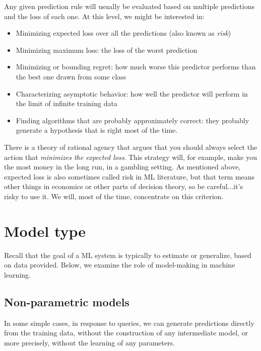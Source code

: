 Any given prediction rule will usually be evaluated based on multiple predictions and the loss of each one.  At this level, we might be interested in:
\begin{itemize}
  \item Minimizing expected loss over all the predictions (also known as {\em risk})
  \item Minimizing maximum loss: the loss of the worst prediction
  \item Minimizing or bounding regret: how much worse this predictor performs than the best one drawn from some class
  \item Characterizing asymptotic behavior: how well the predictor will perform in the limit of infinite training data
  \item Finding algorithms that are probably approximately correct:  they probably generate a hypothesis that is right most of the time.
\end{itemize}

There is a theory of rational agency that argues that you should
always select the action that {\em minimizes the expected loss}.  This
strategy will, for example, make you the most money in the long run,
in a gambling setting.    As mentioned above, expected loss is
also sometimes called risk in ML literature,
but that term means other things in economics or other parts of
decision theory, so be careful...it's risky to use it.  We will, most of the time, concentrate on this criterion.


\section{Model type}

Recall that the goal of a ML system is typically to
estimate or generalize, based on data provided.  Below, we examine the
role of model-making in machine learning.

\subsection{Non-parametric models}

In some simple cases, in response to queries, we can generate
predictions directly from the training data, without the construction
of any intermediate model, or more precisely, without the learning of any parameters. 


